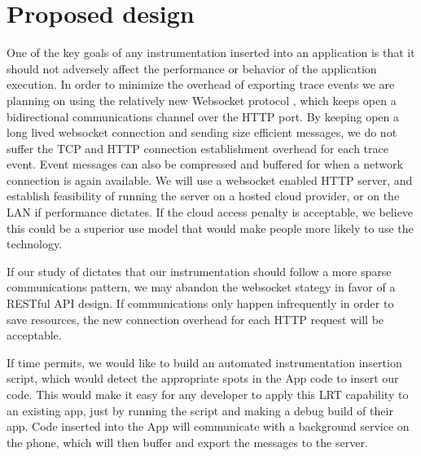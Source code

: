 \documentclass{acm_proc_article-sp}
\begin{document}
\section{Proposed design}
One of the key goals of any instrumentation inserted into an application is 
that it should not adversely affect the performance or behavior of the 
application execution. In order to minimize the overhead of exporting trace 
events we are planning on using the relatively new Websocket protocol 
\cite{WebsocketRFC}, which keeps open a bidirectional communications channel 
over the HTTP port. By keeping open a long lived 
websocket connection and sending size efficient 
messages, we do not suffer the TCP and HTTP connection establishment overhead 
for each trace event. Event messages can also be compressed and buffered for when a 
network connection is again available. We will use a websocket enabled HTTP 
server, and establish feasibility of running the server on a hosted cloud 
provider, or on the LAN if performance dictates. If the cloud access penalty is 
acceptable, we believe this could be a superior use model that would make people
more likely to use the technology. 

If our study of \cite{PeriodicTransfers} dictates that
our instrumentation should follow a more sparse communications pattern, we may abandon the
websocket stategy in favor of a RESTful API\cite{REST} design. If communications
only happen infrequently in order to save resources, the new connection overhead for
each HTTP request will be acceptable.

If time permits, we would like to build an automated instrumentation insertion 
script, which would detect the appropriate spots in the App code to insert our 
code. This would make it easy for any developer to apply this LRT capability to
an existing app, just by running the script and making a debug build of their 
app. Code inserted into the App will communicate with a background service on 
the phone, which will then buffer and export the messages to the server.




{}

\end{document}
